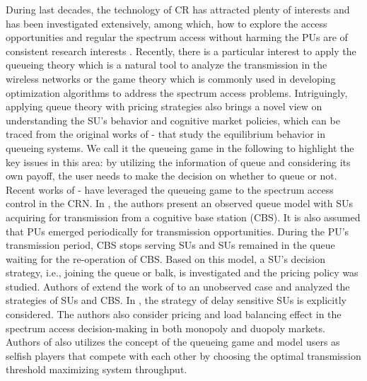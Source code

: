 \documentclass[journal]{IEEEtran}
\begin{document}
During last decades, the technology of CR has attracted plenty of interests and has been investigated
extensively, among which, how to explore the access opportunities
and regular the spectrum access without harming the PUs are of
consistent research interests \cite{Zhao}. Recently, there is a
particular interest to apply the queueing theory \cite{Shiang} which is a natural tool to
analyze the transmission in the wireless networks or the
game theory \cite{Han} which is commonly used in developing optimization algorithms to address the spectrum access problems.
Intriguingly, applying queue theory with pricing strategies also
brings a novel view on understanding the SU's behavior and
cognitive market policies, which can be traced from the original
works of \cite{Naor}-\cite{Altman} that study the equilibrium
behavior in queueing systems. We call it the queueing game in the
following to highlight the key issues in this area: by utilizing the information of queue
and considering its own payoff, the user needs to make the decision on whether to queue or not.
Recent works of \cite{HLi}-\cite{Tran} have leveraged the
queueing game to the spectrum access control in the CRN.
In \cite{HLi}, the authors present an observed queue model with SUs
acquiring for transmission from a cognitive base station (CBS). It
is also assumed that PUs emerged periodically for transmission
opportunities. During the PU's transmission period, CBS stops
serving SUs and SUs remained in the queue waiting for the
re-operation of CBS. Based on this model, a SU's decision
strategy, i.e., joining the queue or balk, is investigated and
the pricing policy was studied. Authors of \cite{Do1} extend the work
of \cite{HLi} to an unobserved case and analyzed the strategies of
SUs and CBS. In \cite{Tran}, the strategy of delay sensitive SUs
is explicitly considered. The authors also consider
pricing and load balancing effect in the spectrum access
decision-making in both monopoly and duopoly markets. Authors of
\cite{Guan} also utilizes the concept of the queueing game and model
users as selfish players that compete with each other by choosing the
optimal transmission threshold maximizing system throughput.
\par
\end{document}
